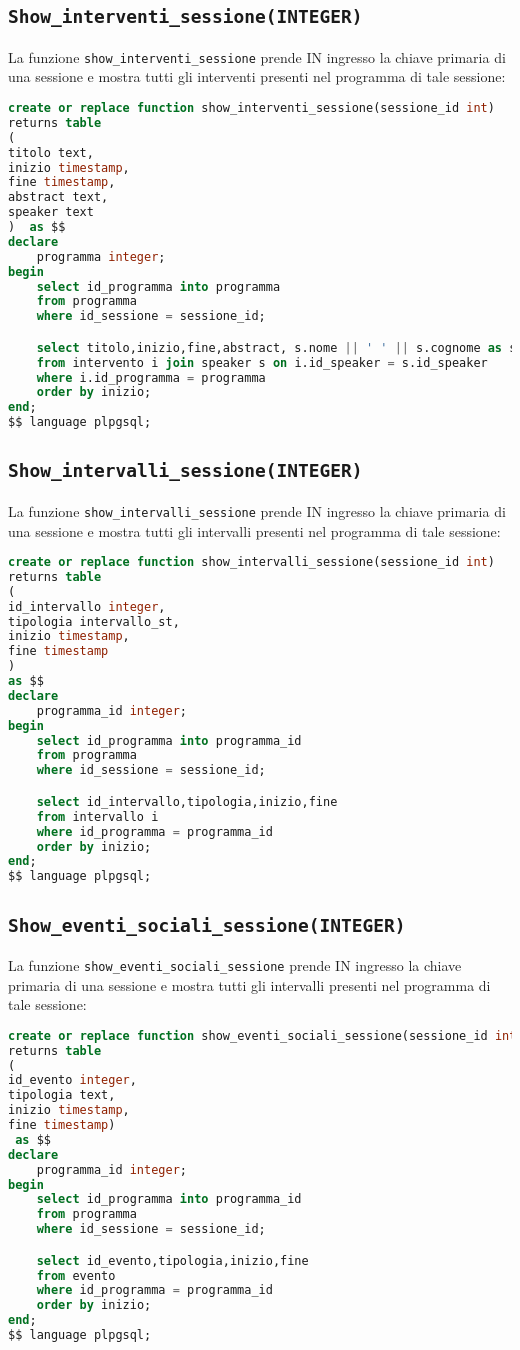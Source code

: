 \subsection{\texttt{Show\_interventi\_sessione(INTEGER)}}
La funzione \texttt{show\_interventi\_sessione} prende IN ingresso la chiave primaria di una sessione e mostra tutti gli interventi presenti nel programma di tale sessione:
\begin{lstlisting}[language=SQL,style=mystyle]
create or replace function show_interventi_sessione(sessione_id int)
returns table
(
titolo text,
inizio timestamp,
fine timestamp,
abstract text,
speaker text
)  as $$
declare 
    programma integer;
begin
    select id_programma into programma
    from programma
    where id_sessione = sessione_id;

    select titolo,inizio,fine,abstract, s.nome || ' ' || s.cognome as speaker
    from intervento i join speaker s on i.id_speaker = s.id_speaker
    where i.id_programma = programma
    order by inizio;
end;
$$ language plpgsql;
\end{lstlisting}

\subsection{\texttt{Show\_intervalli\_sessione(INTEGER)}}
La funzione \texttt{show\_intervalli\_sessione} prende IN ingresso la chiave primaria di una sessione e mostra tutti gli intervalli presenti nel programma di tale sessione:
\begin{lstlisting}[language=SQL,style=mystyle]
create or replace function show_intervalli_sessione(sessione_id int)
returns table
(
id_intervallo integer,
tipologia intervallo_st,
inizio timestamp,
fine timestamp
)  
as $$
declare 
    programma_id integer;
begin
    select id_programma into programma_id
    from programma
    where id_sessione = sessione_id;

    select id_intervallo,tipologia,inizio,fine
    from intervallo i
    where id_programma = programma_id
    order by inizio;
end;
$$ language plpgsql;
\end{lstlisting}
\subsection{\texttt{Show\_eventi\_sociali\_sessione(INTEGER)}}
La funzione \texttt{show\_eventi\_sociali\_sessione} prende IN ingresso la chiave primaria di una sessione e mostra tutti gli intervalli presenti nel programma di tale sessione:
\begin{lstlisting}[language=SQL,style=mystyle]
create or replace function show_eventi_sociali_sessione(sessione_id int)
returns table
(
id_evento integer,
tipologia text,
inizio timestamp,
fine timestamp) 
 as $$
declare 
    programma_id integer;
begin
    select id_programma into programma_id
    from programma
    where id_sessione = sessione_id;

    select id_evento,tipologia,inizio,fine
    from evento
    where id_programma = programma_id
    order by inizio;
end;
$$ language plpgsql;
\end{lstlisting}
